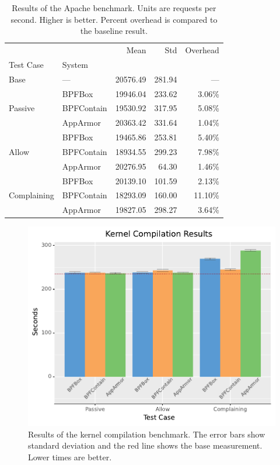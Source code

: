 \documentclass[
  fontsize=12pt,
  titlepage=firstiscover,
  paper=letter,
oneside,
  cleardoublepage=plain,
  parskip=half-,
  DIV=10,
  parindent,
  appendixprefix,
  chapterprefix,
  listof=totoc,
]{scrbook}
\begin{document}
\begin{table}[ht!]
\centering
\footnotesize
\caption[Results of the Apache benchmark]{Results of the Apache benchmark. Units are requests per second. Higher is better. Percent overhead is compared to the baseline result.}
\label{tab:phoronix-apache}
\begin{tabular}{llrrr}
\toprule
            &          &      Mean &     Std & Overhead \\
Test Case & System &           &         &          \\
\midrule
Base & --- &  20576.49 &  281.94 &      --- \\
\cline{1-5}
\multirow{3}{*}{Passive} & BPFBox &  19946.04 &  233.62 &   3.06\% \\
            & BPFContain &  19530.92 &  317.95 &   5.08\% \\
            & AppArmor &  20363.42 &  331.64 &   1.04\% \\
\cline{1-5}
\multirow{3}{*}{Allow} & BPFBox &  19465.86 &  253.81 &   5.40\% \\
            & BPFContain &  18934.55 &  299.23 &   7.98\% \\
            & AppArmor &  20276.95 &   64.30 &   1.46\% \\
\cline{1-5}
\multirow{3}{*}{Complaining} & BPFBox &  20139.10 &  101.59 &   2.13\% \\
            & BPFContain &  18293.09 &  160.00 &  11.10\% \\
            & AppArmor &  19827.05 &  298.27 &   3.64\% \\
\bottomrule
\end{tabular}
\end{table}
 

\begin{figure}[htp]
  \centering
  \includegraphics[width=0.6\linewidth]{results/graphs/Kernel-Compilation.pdf}
  \caption[Results of the kernel compilation benchmark]{
    Results of the kernel compilation benchmark.
    The error bars show standard deviation and the red line shows the base measurement.
    Lower times are better.
  }\label{fig:phoronix-kernel}
\end{figure}
\end{document}
